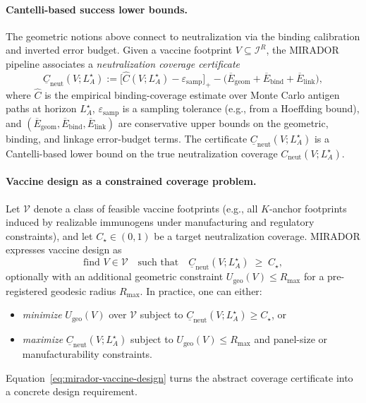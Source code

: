 \documentclass[11pt]{article}
\begin{document}
\paragraph{Cantelli-based success lower bounds.}
The geometric notions above connect to neutralization via the binding calibration and inverted
error budget. Given a vaccine footprint $V \subseteq \mathcal{I}^R$, the MIRADOR pipeline
associates a \emph{neutralization coverage certificate}
\begin{equation}
  \underline{C}_{\mathrm{neut}}(V;L_A^\star)
  := \bigl[\widehat{C}(V;L_A^\star) - \varepsilon_{\mathrm{samp}}\bigr]_+
     - \bigl( \overline{E}_{\mathrm{geom}} + \overline{E}_{\mathrm{bind}}
              + \overline{E}_{\mathrm{link}} \bigr),
\end{equation}
where $\widehat{C}$ is the empirical binding-coverage estimate over Monte Carlo antigen paths at
horizon $L_A^\star$, $\varepsilon_{\mathrm{samp}}$ is a sampling tolerance (e.g., from a Hoeffding
bound), and $(\overline{E}_{\mathrm{geom}},\overline{E}_{\mathrm{bind}},\overline{E}_{\mathrm{link}})$ are
conservative upper bounds on the geometric, binding, and linkage error-budget terms. The
certificate $\underline{C}_{\mathrm{neut}}(V;L_A^\star)$ is a Cantelli-based lower bound on the
true neutralization coverage $C_{\mathrm{neut}}(V;L_A^\star)$.

\paragraph{Vaccine design as a constrained coverage problem.}
Let $\mathcal{V}$ denote a class of feasible vaccine footprints (e.g., all $K$-anchor footprints
induced by realizable immunogens under manufacturing and regulatory constraints), and let
$C_\star \in (0,1)$ be a target neutralization coverage. MIRADOR expresses vaccine design as
\begin{equation}
\label{eq:mirador-vaccine-design}
  \text{find } V \in \mathcal{V}
  \quad\text{such that}\quad
  \underline{C}_{\mathrm{neut}}(V;L_A^\star) \;\ge\; C_\star,
\end{equation}
optionally with an additional geometric constraint $U_{\mathrm{geo}}(V) \le R_{\max}$ for a
pre-registered geodesic radius $R_{\max}$. In practice, one can either:
\begin{itemize}
  \item \emph{minimize} $U_{\mathrm{geo}}(V)$ over $\mathcal{V}$ subject to
        $\underline{C}_{\mathrm{neut}}(V;L_A^\star) \ge C_\star$, or
  \item \emph{maximize} $\underline{C}_{\mathrm{neut}}(V;L_A^\star)$ subject to
        $U_{\mathrm{geo}}(V) \le R_{\max}$ and panel-size or manufacturability constraints.
\end{itemize}
Equation~\eqref{eq:mirador-vaccine-design} turns the abstract coverage certificate into a concrete
design requirement.
\end{document}
